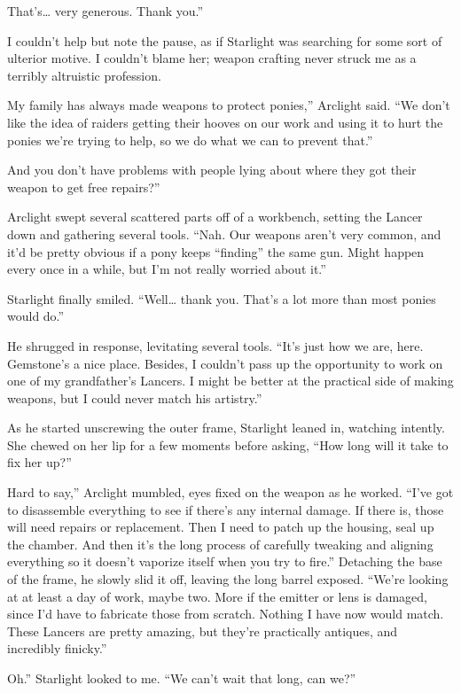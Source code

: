 \leavevmode{}That’s… very generous. Thank you.”

I couldn’t help but note the pause, as if Starlight was searching for some sort of ulterior motive. I couldn’t blame her; weapon crafting never struck me as a terribly altruistic profession.

\leavevmode{}My family has always made weapons to protect ponies,” Arclight said. “We don’t like the idea of raiders getting their hooves on our work and using it to hurt the ponies we’re trying to help, so we do what we can to prevent that.”

\leavevmode{}And you don’t have problems with people lying about where they got their weapon to get free repairs?”

Arclight swept several scattered parts off of a workbench, setting the Lancer down and gathering several tools. “Nah. Our weapons aren’t very common, and it’d be pretty obvious if a pony keeps “finding” the same gun. Might happen every once in a while, but I’m not really worried about it.”

Starlight finally smiled. “Well… thank you. That’s a lot more than most ponies would do.”

He shrugged in response, levitating several tools. “It’s just how we are, here. Gemstone’s a nice place. Besides, I couldn’t pass up the opportunity to work on one of my grandfather’s Lancers. I might be better at the practical side of making weapons, but I could never match his artistry.”

As he started unscrewing the outer frame, Starlight leaned in, watching intently. She chewed on her lip for a few moments before asking, “How long will it take to fix her up?”

\leavevmode{}Hard to say,” Arclight mumbled, eyes fixed on the weapon as he worked. “I’ve got to disassemble everything to see if there’s any internal damage. If there is, those will need repairs or replacement. Then I need to patch up the housing, seal up the chamber. And then it’s the long process of carefully tweaking and aligning everything so it doesn’t vaporize itself when you try to fire.” Detaching the base of the frame, he slowly slid it off, leaving the long barrel exposed. “We’re looking at at least a day of work, maybe two. More if the emitter or lens is damaged, since I’d have to fabricate those from scratch. Nothing I have now would match. These Lancers are pretty amazing, but they’re practically antiques, and incredibly finicky.”

\leavevmode{}Oh.” Starlight looked to me. “We can’t wait that long, can we?”

